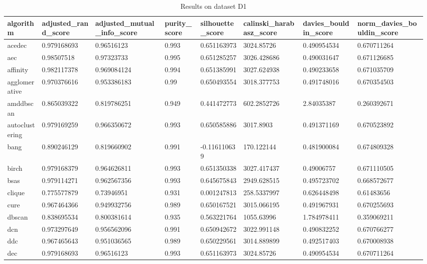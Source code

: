 \begin{table}[H]
\centering
\caption{Results on dataset D1}
\label{tab:params:D1}
\begin{tabular}{|l|l|l|l|l|l|l|l|}
\hline
algorithm & adjusted\_rand\_score & adjusted\_mutual\_info\_score & purity\_score & silhouette\_score & calinski\_harabasz\_score & davies\_bouldin\_score & norm\_davies\_bouldin\_score \\
\hline
acedec & 0.979168693 & 0.96516123 & 0.993 & 0.651163973 & 3024.85726 & 0.490954534 & 0.670711264 \\
\hline
aec & 0.98507518 & 0.97323733 & 0.995 & 0.651285257 & 3026.428686 & 0.490031647 & 0.671126685 \\
\hline
affinity & 0.982117378 & 0.969084124 & 0.994 & 0.651385991 & 3027.624938 & 0.490233658 & 0.671035709 \\
\hline
agglomerative & 0.970376616 & 0.953386183 & 0.99 & 0.650493554 & 3018.377753 & 0.491748016 & 0.670354503 \\
\hline
amddbscan & 0.865039322 & 0.819786251 & 0.949 & 0.441472773 & 602.2852726 & 2.84035387 & 0.260392671 \\
\hline
autoclustering & 0.979169259 & 0.966350672 & 0.993 & 0.650585886 & 3017.8903 & 0.491371169 & 0.670523892 \\
\hline
bang & 0.890246129 & 0.819660902 & 0.991 & -0.116110639 & 170.122144 & 0.481900084 & 0.674809328 \\
\hline
birch & 0.979168379 & 0.964626811 & 0.993 & 0.651350338 & 3027.417437 & 0.49006757 & 0.671110505 \\
\hline
bsas & 0.979114271 & 0.962567356 & 0.993 & 0.645675843 & 2949.628515 & 0.495723702 & 0.668572677 \\
\hline
clique & 0.775577879 & 0.73946951 & 0.931 & 0.001247813 & 258.5337997 & 0.626448498 & 0.61483656 \\
\hline
cure & 0.967464366 & 0.949932756 & 0.989 & 0.650167521 & 3015.066195 & 0.491967931 & 0.670255693 \\
\hline
dbscan & 0.838695534 & 0.800381614 & 0.935 & 0.563221764 & 1055.63996 & 1.784978411 & 0.359069211 \\
\hline
dcn & 0.973297649 & 0.956562096 & 0.991 & 0.650942672 & 3022.991148 & 0.490832252 & 0.670766277 \\
\hline
ddc & 0.967465643 & 0.951036565 & 0.989 & 0.650229561 & 3014.889899 & 0.492517403 & 0.670008938 \\
\hline
dec & 0.979168693 & 0.96516123 & 0.993 & 0.651163973 & 3024.85726 & 0.490954534 & 0.670711264 \\

\end{tabular}
\end{table}
